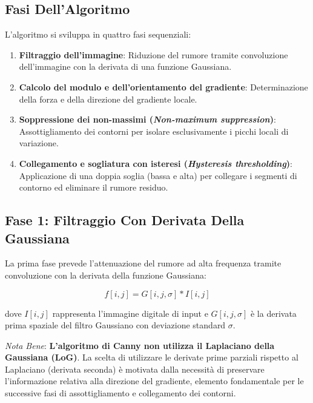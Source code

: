 ﻿\documentclass[11pt, a4paper]{article}
\begin{document}
\subsection{Fasi Dell'Algoritmo}

L'algoritmo si sviluppa in quattro fasi sequenziali:

\begin{enumerate}
    \item \textbf{Filtraggio dell'immagine}: Riduzione del rumore tramite convoluzione dell'immagine con la derivata di una funzione Gaussiana.
    \item \textbf{Calcolo del modulo e dell'orientamento del gradiente}: Determinazione della forza e della direzione del gradiente locale.
    \item \textbf{Soppressione dei non-massimi (\emph{Non-maximum suppression})}: Assottigliamento dei contorni per isolare esclusivamente i picchi locali di variazione.
    \item \textbf{Collegamento e sogliatura con isteresi (\emph{Hysteresis thresholding})}: Applicazione di una doppia soglia (bassa e alta) per collegare i segmenti di contorno ed eliminare il rumore residuo.
\end{enumerate}

\subsection{Fase 1: Filtraggio Con Derivata Della Gaussiana}

La prima fase prevede l'attenuazione del rumore ad alta frequenza tramite convoluzione con la derivata della funzione Gaussiana:

\[ f[i, j] = G[i, j, \sigma] * I[i, j] \]

dove $I[i, j]$ rappresenta l'immagine digitale di input e $G[i, j, \sigma]$ è la derivata prima spaziale del filtro Gaussiano con deviazione standard $\sigma$.

\emph{Nota Bene}: \textbf{L'algoritmo di Canny non utilizza il Laplaciano della Gaussiana (LoG)}. La scelta di utilizzare le derivate prime parziali rispetto al Laplaciano (derivata seconda) è motivata dalla necessità di preservare l'informazione relativa alla direzione del gradiente, elemento fondamentale per le successive fasi di assottigliamento e collegamento dei contorni.

\end{document}
